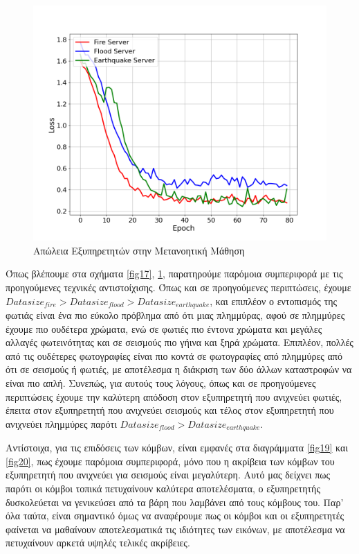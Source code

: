 \begin{figure}[ht]
    \centering
    \includegraphics[width=\textwidth]{figures/chapter4/Server_Losses.png}
    \caption{Απώλεια Εξυπηρετητών στην Μετανοητική Μάθηση}
    \label{fig18}
\end{figure}

Όπως βλέπουμε στα σχήματα \ref{fig17}, \ref{fig18}, παρατηρούμε παρόμοια συμπεριφορά με τις προηγούμενες τεχνικές αντιστοίχισης. Όπως και σε προηγούμενες περιπτώσεις, έχουμε $Datasize_{fire} > Datasize_{flood} >Datasize_{earthquake}$, και επιπλέον ο εντοπισμός της φωτιάς είναι ένα πιο εύκολο πρόβλημα από ότι μιας πλημμύρας, αφού σε πλημμύρες έχουμε πιο ουδέτερα χρώματα, ενώ σε φωτιές πιο έντονα χρώματα και μεγάλες αλλαγές φωτεινότητας και σε σεισμούς πιο γήινα και ξηρά χρώματα. Επιπλέον, πολλές από τις ουδέτερες φωτογραφίες είναι πιο κοντά σε φωτογραφίες από πλημμύρες από ότι σε σεισμούς ή φωτιές, με αποτέλεσμα η διάκριση των δύο άλλων καταστροφών να είναι πιο απλή. Συνεπώς, για αυτούς τους λόγους, όπως και σε προηγούμενες περιπτώσεις έχουμε την καλύτερη απόδοση στον εξυπηρετητή που ανιχνεύει φωτιές, έπειτα στον εξυπηρετητή που ανιχνεύει σεισμούς και τέλος στον εξυπηρετητή που ανιχνεύει πλημμύρες παρότι $Datasize_{flood} >Datasize_{earthquake}$. 

Αντίστοιχα, για τις επιδόσεις των κόμβων, είναι εμφανές στα διαγράμματα \ref*{fig19} και \ref*{fig20}, πως έχουμε παρόμοια συμπεριφορά, μόνο που η ακρίβεια των κόμβων του εξυπηρετητή που ανιχνεύει για σεισμούς είναι μεγαλύτερη. Αυτό μας δείχνει πως παρότι οι κόμβοι τοπικά πετυχαίνουν καλύτερα αποτελέσματα, ο εξυπηρετητής δυσκολεύεται να γενικεύσει από τα βάρη που λαμβάνει από τους κόμβους του. Παρ' όλα ταύτα, είναι σημαντικό όμως να αναφέρουμε πως οι κόμβοι και οι εξυπηρετητές φαίνεται να μαθαίνουν αποτελεσματικά τις ιδιότητες των εικόνων, με αποτέλεσμα να πετυχαίνουν αρκετά υψηλές τελικές ακρίβειες. 

